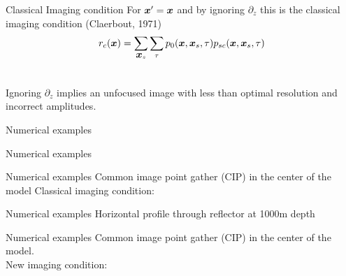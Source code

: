 \documentclass[xcolor=dvipsnames]{beamer}
\begin{document}
\begin{frame}{Classical Imaging condition}
For $\mbox{\boldmath $x$}'=\mbox{\boldmath $x$}$ and by ignoring $\partial_z$ this is the classical imaging condition (Claerbout, 1971) \cite{Claerbout1971}
\begin{eqnarray}
  r_{c}(\mbox{\boldmath $x$}) =
    \sum_{\mbox{\boldmath $x$}_s}\sum_{\tau}p_0(\mbox{\boldmath $x$},\mbox{\boldmath $x$}_s,\tau)p_{sc}(\mbox{\boldmath $x$},\mbox{\boldmath $x$}_s,\tau)\nonumber\\ 
                                                 \nonumber
\end{eqnarray}

Ignoring $\partial_z$ implies an unfocused image with 
less than optimal resolution and incorrect amplitudes.
\end{frame}
\begin{frame}{Numerical examples}
\begin{figure}
\end{figure}
\end{frame}
\begin{frame}{Numerical examples}
\begin{figure}
\end{figure}
\end{frame}
\begin{frame}{Numerical examples}
Common image point gather (CIP) in the center of the model
Classical imaging condition: 
\begin{figure}
\end{figure}
\end{frame}
\begin{frame}{Numerical examples}
Horizontal profile through reflector at 1000m depth
\begin{figure}
\end{figure}
\end{frame}
\begin{frame}{Numerical examples}
Common image point gather (CIP) in the center of the model.\\
New imaging condition: 
\begin{figure}
\end{figure}
\end{frame}
\end{document}

